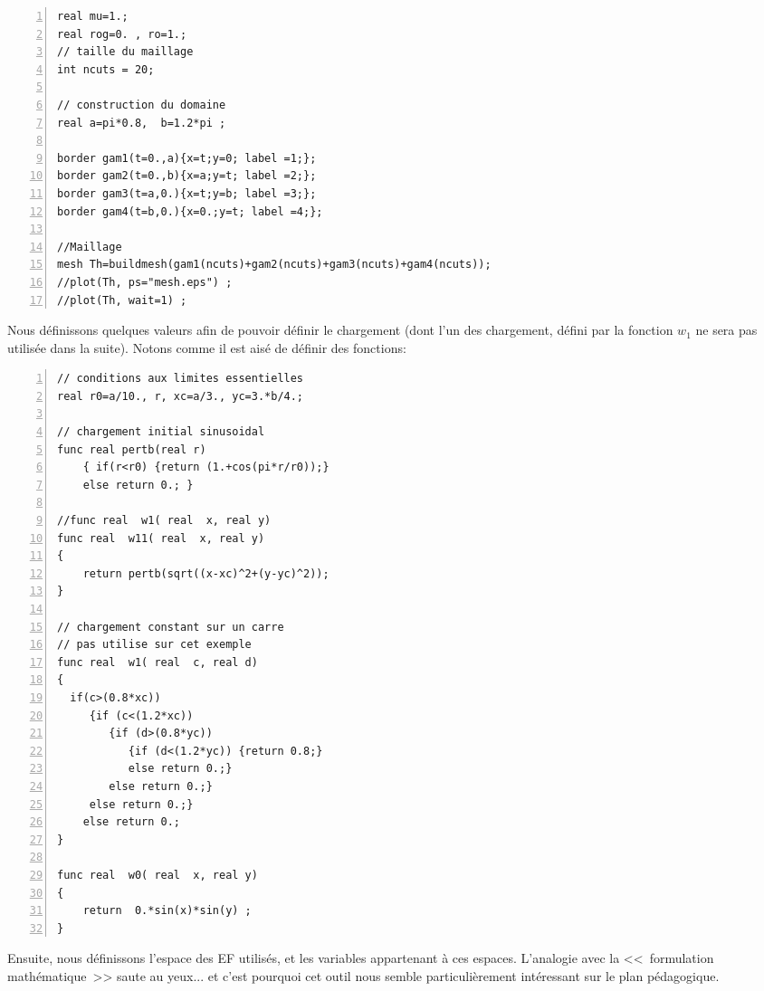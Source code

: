 \medskip
\color{gris}\scriptsize
\begin{Verbatim}[numbers=left,numbersep=3pt]
real mu=1.; 
real rog=0. , ro=1.;
// taille du maillage
int ncuts = 20;

// construction du domaine
real a=pi*0.8,  b=1.2*pi ;  

border gam1(t=0.,a){x=t;y=0; label =1;};
border gam2(t=0.,b){x=a;y=t; label =2;};
border gam3(t=a,0.){x=t;y=b; label =3;};
border gam4(t=b,0.){x=0.;y=t; label =4;};

//Maillage
mesh Th=buildmesh(gam1(ncuts)+gam2(ncuts)+gam3(ncuts)+gam4(ncuts)); 
//plot(Th, ps="mesh.eps") ;
//plot(Th, wait=1) ;
\end{Verbatim}
\color{black}\normalsize

\medskip
Nous définissons quelques valeurs afin de pouvoir définir le chargement (dont l'un des chargement,
défini par la fonction $w_1$ ne sera pas utilisée dans la suite). Notons comme il est aisé de définir
des fonctions:

\color{gris}\scriptsize
\begin{multicols}{2}
\begin{Verbatim}[numbers=left,numbersep=3pt,firstnumber=last]
// conditions aux limites essentielles 
real r0=a/10., r, xc=a/3., yc=3.*b/4.; 

// chargement initial sinusoidal
func real pertb(real r)
	{ if(r<r0) {return (1.+cos(pi*r/r0));}
	else return 0.; }

//func real  w1( real  x, real y)
func real  w11( real  x, real y)
{
	return pertb(sqrt((x-xc)^2+(y-yc)^2)); 
}

// chargement constant sur un carre
// pas utilise sur cet exemple
func real  w1( real  c, real d)
{
  if(c>(0.8*xc))
     {if (c<(1.2*xc)) 
        {if (d>(0.8*yc))
           {if (d<(1.2*yc)) {return 0.8;}
           else return 0.;}
        else return 0.;}
     else return 0.;}
	else return 0.;
}

func real  w0( real  x, real y)
{
	return  0.*sin(x)*sin(y) ; 
}
\end{Verbatim}
\end{multicols}
\color{black}\normalsize

\medskip
Ensuite, nous définissons l'espace des EF utilisés, et les variables appartenant à ces espaces.
L'analogie avec la <<~formulation mathématique~>> saute au yeux... et c'est pourquoi cet outil
nous semble particulièrement intéressant sur le plan pédagogique.

